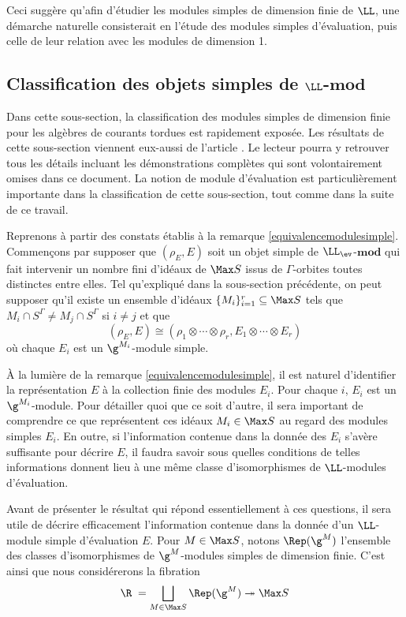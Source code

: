 Ceci suggère qu'afin d'étudier les modules simples de dimension finie de $\LL$, une démarche naturelle consisterait en l'étude des modules simples d'évaluation, puis celle de leur relation avec les modules de dimension 1.


%
\subsection{Classification des objets simples de $\LL$-$\mathbf{mod}$}

Dans cette sous-section, la classification des modules simples de dimension finie pour les algèbres de courants tordues est rapidement exposée. Les résultats de cette sous-section viennent eux-aussi de l'article \cite{LauTCA}. Le lecteur pourra y retrouver tous les détails incluant les démonstrations complètes qui sont volontairement omises dans ce document. La notion de module d'évaluation est particulièrement importante dans la classification de cette sous-section, tout comme dans la suite de ce travail.

Reprenons à partir des constats établis à la remarque \ref{equivalencemodulesimple}. Commençons par supposer que $(\rho_E,E)$ soit un objet simple de $\LL_{\ev}$-$\mathbf{mod}$ qui fait intervenir un nombre fini d'idéaux de $\Max S$ issus de $\Gamma$-orbites toutes distinctes entre elles. Tel qu'expliqué dans la sous-section précédente, on peut supposer qu'il existe un ensemble d'idéaux $\{M_i\}_{i=1}^r \subseteq \Max S$ tels que $M_i \cap S^\Gamma \neq M_j \cap S^\Gamma$ si $i \neq j$ et que 
$$ (\rho_E,E) \cong (\rho_1 \otimes \cdots \otimes \rho_r, E_1 \otimes \cdots \otimes E_r) $$
où chaque $E_i$ est un $\g^{M_i}$-module simple.

À la lumière de la remarque \ref{equivalencemodulesimple}, il est naturel d'identifier la représentation $E$ à la collection finie des modules $E_i$. Pour chaque $i$, $E_i$ est un $\g^{M_i}$-module. Pour détailler quoi que ce soit d'autre, il sera important de comprendre ce que représentent ces idéaux $M_i \in \Max S$ au regard des modules simples $E_i$. En outre, si l'information contenue dans la donnée des $E_i$ s'avère suffisante pour décrire $E$, il faudra savoir sous quelles conditions de telles informations donnent lieu à une même classe d'isomorphismes de $\LL$-modules d'évaluation. 

Avant de présenter le résultat qui répond essentiellement à ces questions, il sera utile de décrire efficacement l'information contenue dans la donnée d'un $\LL$-module simple d'évaluation $E$. Pour $M \in \Max S$, notons $\Rep(\g^M)$ l'ensemble des classes d'isomorphismes de $\g^M$-modules simples de dimension finie. C'est ainsi que nous considérerons la fibration
$$ \R \; = \bigsqcup_{M \in \Max S} \Rep(\g^M) \twoheadrightarrow \Max S $$

